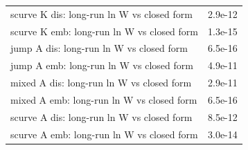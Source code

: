 \begin{tabular}{lc}
scurve K dis: long-run ln W vs closed form & 2.9e-12\\
scurve K emb: long-run ln W vs closed form & 1.3e-15\\
jump A dis: long-run ln W vs closed form & 6.5e-16\\
jump A emb: long-run ln W vs closed form & 4.9e-11\\
mixed A dis: long-run ln W vs closed form & 2.9e-11\\
mixed A emb: long-run ln W vs closed form & 6.5e-16\\
scurve A dis: long-run ln W vs closed form & 8.5e-12\\
scurve A emb: long-run ln W vs closed form & 3.0e-14\\
\bottomrule\end{tabular}
